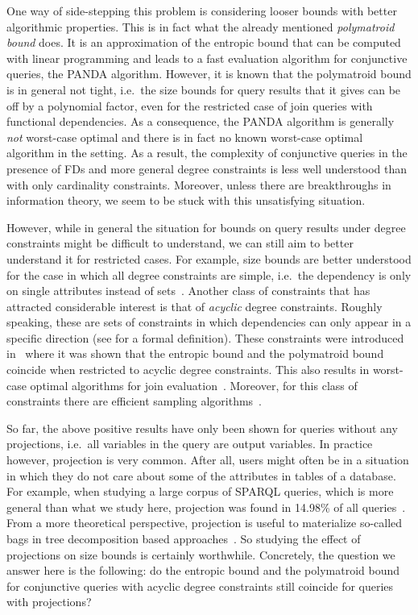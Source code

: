 \documentclass[a4paper,cleveref]{lipics-v2021}
\begin{document}
One way of side-stepping this problem is considering looser bounds with better algorithmic properties. This is in fact what the already mentioned \emph{polymatroid bound} does. It is an approximation of the entropic bound that can be computed with linear programming and leads to a fast evaluation algorithm for conjunctive queries, the PANDA algorithm. However, it is known that the polymatroid bound is in general not tight, i.e.~the size bounds for query results that it gives can be off by a polynomial factor, even for the restricted case of join queries with functional dependencies. As a consequence, the PANDA algorithm is generally \emph{not} worst-case optimal and there is in fact no known worst-case optimal algorithm in the setting. As a result, the complexity of conjunctive queries in the presence of FDs and more general degree constraints is less well understood than with only cardinality constraints. Moreover, unless there are breakthroughs in information theory, we seem to be stuck with this unsatisfying situation.

However, while in general the situation for bounds on query results under degree constraints might be difficult to understand, we can still aim to better understand it for restricted cases. For example, size bounds are better understood for the case in which all degree constraints are simple, i.e.~the dependency is only on single attributes instead of sets~\cite{GottlobLVV12,GogaczT17,abo2016computing,Suciu23}. 
Another class of constraints that has attracted considerable interest is that of \emph{acyclic} degree constraints. Roughly speaking, these are sets of constraints in which dependencies can only appear in a specific direction (see  for a formal definition).
%
These constraints were introduced in~\cite{ngo2018worstb} where it was shown that the entropic bound and the polymatroid bound coincide when restricted to acyclic degree constraints. This also results in worst-case optimal algorithms for join evaluation~\cite{ngo2018worstb,CapelliIS25}. Moreover, for this class of constraints there are efficient sampling algorithms~\cite{WangT26,CapelliIS25}. 

So far, the above positive results have only been shown for queries without any projections, i.e.~all variables in the query are output variables. In practice however, projection is very common. After all, users might often be in a situation in which they do not care about some of the attributes in tables of a database. For example, when studying a large corpus of SPARQL queries, which is more general than what we study here, projection was found in 14.98\% of all queries~\cite{BonifatiMT20}. From a more theoretical perspective, projection is useful to materialize so-called bags in tree decomposition based approaches~\cite{GottlobLS02,GroheM14,Khamis0S17}. So studying the effect of projections on size bounds %
is certainly worthwhile. 
%
Concretely, the question we answer here is the following: do the entropic bound and the polymatroid bound for conjunctive queries with acyclic degree constraints still coincide for queries with projections?
\end{document}
